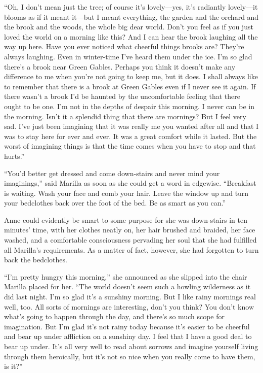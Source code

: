 \documentclass[a4paper]{article}
\begin{document}
``Oh, I don't mean just the tree; of course it's lovely---yes, it's radiantly lovely---it blooms as if it meant it---but I meant everything, the garden and the orchard and the brook and the woods, the whole big dear world. Don't you feel as if you just loved the world on a morning like this? And I can hear the brook laughing all the way up here. Have you ever noticed what cheerful things brooks are? They're always laughing. Even in winter-time I've heard them under the ice. I'm so glad there's a brook near Green Gables. Perhaps you think it doesn't make any difference to me when you're not going to keep me, but it does. I shall always like to remember that there is a brook at Green Gables even if I never see it again. If there wasn't a brook I'd be haunted by the uncomfortable feeling that there ought to be one. I'm not in the depths of despair this morning. I never can be in the morning. Isn't it a splendid thing that there are mornings? But I feel very sad. I've just been imagining that it was really me you wanted after all and that I was to stay here for ever and ever. It was a great comfort while it lasted. But the worst of imagining things is that the time comes when you have to stop and that hurts.''

\LARGE{``You'd better get dressed and come down-stairs and never mind your imaginings,'' said Marilla as soon as she could get a word in edgewise. ``Breakfast is waiting. Wash your face and comb your hair. Leave the window up and turn your bedclothes back over the foot of the bed. Be as smart as you can.''}

Anne could evidently be smart to some purpose for she was down-stairs in ten minutes' time, with her clothes neatly on, her hair brushed and braided, her face washed, and a comfortable consciousness pervading her soul that she had fulfilled all Marilla's requirements. As a matter of fact, however, she had forgotten to turn back the bedclothes.

``I'm pretty hungry this morning,'' she announced as she slipped into the chair Marilla placed for her. ``The world doesn't seem such a howling wilderness as it did last night. I'm so glad it's a sunshiny morning. But I like rainy mornings real well, too. All sorts of mornings are interesting, don't you think? You don't know what's going to happen through the day, and there's so much scope for imagination. But I'm glad it's not rainy today because it's easier to be cheerful and bear up under affliction on a sunshiny day. I feel that I have a good deal to bear up under. It's all very well to read about sorrows and imagine yourself living through them heroically, but it's not so nice when you really come to have them, is it?''
\end{document}
